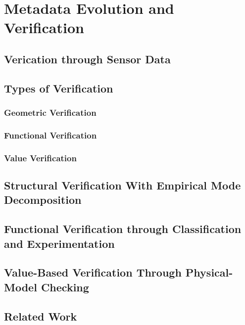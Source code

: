 \chapter{Metadata Evolution and Verification}

\section{Verication through Sensor Data}

\section{Types of Verification}
\subsection{Geometric Verification}
\subsection{Functional Verification}
\subsection{Value Verification}

\section{Structural Verification With Empirical Mode Decomposition}

\section{Functional Verification through Classification and Experimentation}

\section{Value-Based Verification Through Physical-Model Checking}

\section{Related Work}



